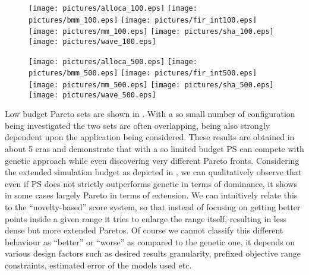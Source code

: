 \begin{figure}
  \begin{center}
    \texttt{[image: pictures/alloca\_100.eps]}
    \texttt{[image: pictures/bmm\_100.eps]}
    \texttt{[image: pictures/fir\_int100.eps]}
    \texttt{[image: pictures/mm\_100.eps]}
    \texttt{[image: pictures/sha\_100.eps]}
    \texttt{[image: pictures/wave\_100.eps]} 
  \end{center}
\end{figure}

\begin{figure}
  \begin{center}
    \texttt{[image: pictures/alloca\_500.eps]}
    \texttt{[image: pictures/bmm\_500.eps]}
    \texttt{[image: pictures/fir\_int500.eps]}
    \texttt{[image: pictures/mm\_500.eps]}
    \texttt{[image: pictures/sha\_500.eps]}
    \texttt{[image: pictures/wave\_500.eps]} 
  \end{center}
\end{figure}
Low budget Pareto sets are shown in . With a so small number of
configuration being investigated the two sets are often overlapping,
being also strongly dependent upon the application being considered.
These results are obtained in about 5 eras and demonstrate that with a so limited budget PS can compete with
genetic approach while even discovering very different Pareto fronts. 
Considering the extended simulation budget as depicted in
, we can qualitatively observe that
even if PS does not strictly outperforms genetic in terms of dominance, it shows in
some cases largely Pareto in terms of extension. We can intuitively
relate this to the ``novelty-based'' score system, so that instead of
focusing on getting better points inside a given range it tries to
enlarge the range itself, resulting in less dense but more extended
Paretos. Of course we cannot classify this different behaviour as
``better'' or ``worse'' as compared to the genetic one, it depends on
various design factors such as desired results granularity, prefixed objective
range constraints, estimated error of the models used etc.


